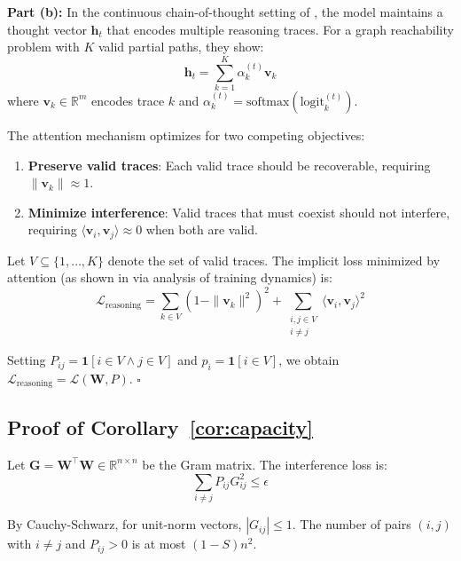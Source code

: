 \documentclass[10pt]{article} %
\theoremstyle{plain}
\theoremstyle{definition}
\theoremstyle{remark}
\begin{document}
\textbf{Part (b):} In the continuous chain-of-thought setting of \citet{zhu2025reasoning}, the model maintains a thought vector $\mathbf{h}_t$ that encodes multiple reasoning traces. For a graph reachability problem with $K$ valid partial paths, they show:
\begin{equation}
\mathbf{h}_t = \sum_{k=1}^K \alpha_k^{(t)} \mathbf{v}_k
\end{equation}
where $\mathbf{v}_k \in \mathbb{R}^m$ encodes trace $k$ and $\alpha_k^{(t)} = \text{softmax}(\text{logit}_k^{(t)})$.

The attention mechanism optimizes for two competing objectives:
\begin{enumerate}
    \item \textbf{Preserve valid traces}: Each valid trace should be recoverable, requiring $\|\mathbf{v}_k\| \approx 1$.
    \item \textbf{Minimize interference}: Valid traces that must coexist should not interfere, requiring $\langle \mathbf{v}_i, \mathbf{v}_j \rangle \approx 0$ when both are valid.
\end{enumerate}

Let $V \subseteq \{1, \ldots, K\}$ denote the set of valid traces. The implicit loss minimized by attention (as shown in \citet{zhu2025emergence} via analysis of training dynamics) is:
\begin{equation}
\mathcal{L}_{\text{reasoning}} = \sum_{k \in V} (1 - \|\mathbf{v}_k\|^2)^2 + \sum_{\substack{i, j \in V \\ i \neq j}} \langle \mathbf{v}_i, \mathbf{v}_j \rangle^2
\end{equation}

Setting $P_{ij} = \mathbf{1}[i \in V \land j \in V]$ and $p_i = \mathbf{1}[i \in V]$, we obtain $\mathcal{L}_{\text{reasoning}} = \mathcal{L}(\mathbf{W}, P)$. $\square$

\subsection{Proof of Corollary~\ref{cor:capacity}}

Let $\mathbf{G} = \mathbf{W}^\top \mathbf{W} \in \mathbb{R}^{n \times n}$ be the Gram matrix. The interference loss is:
\begin{equation}
\sum_{i \neq j} P_{ij} G_{ij}^2 \leq \epsilon
\end{equation}

By Cauchy-Schwarz, for unit-norm vectors, $|G_{ij}| \leq 1$. The number of pairs $(i,j)$ with $i \neq j$ and $P_{ij} > 0$ is at most $(1-S)n^2$.
\end{document}
